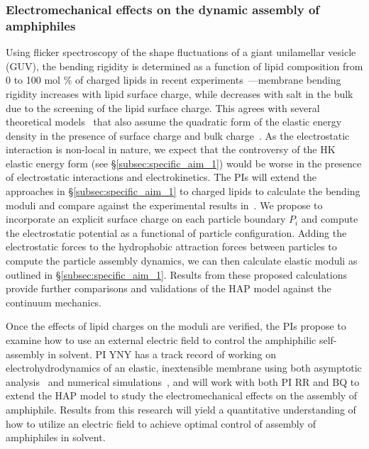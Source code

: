 \subsubsection{Electromechanical effects on the dynamic assembly of amphiphiles \label{subsubsec:em_effects}}
Using flicker spectroscopy of the shape fluctuations of a giant
unilamellar vesicle (GUV), the bending rigidity is determined as a
function of lipid composition from 0 to 100 mol $\%$ of charged lipids
in recent experiments~\cite{FaizEtAl2019_SoftMatt}---membrane bending
rigidity increases with lipid surface charge, while decreases with salt
in the bulk due to the screening of the lipid surface charge. This
agrees with several theoretical models~\cite{Kralchevsky1996_JCIS,
May1996_JChemPhys, LoubetEtAl2013_PRE} that also assume the quadratic
form of the elastic energy density in the presence of surface charge and
bulk charge~\cite{DuplantierGoldstein1990_PRL, Winterhalter1992_JPC}. As
the electrostatic interaction is non-local in nature, we expect that the
controversy of the HK elastic energy form (see
\S\ref{subsec:specific_aim_1}) would be worse in the presence of
electrostatic interactions and electrokinetics. The PIs will extend
the approaches in \S\ref{subsec:specific_aim_1} to charged lipids to
calculate the bending moduli and compare against the experimental
results in~\cite{FaizEtAl2019_SoftMatt}. We propose to incorporate an
explicit surface charge on each particle boundary $P_i$ and compute the
electrostatic potential as a functional of particle configuration.
Adding the electrostatic forces to the hydrophobic attraction forces
between particles to compute the particle assembly dynamics, we can then
calculate elastic moduli as outlined in \S\ref{subsec:specific_aim_1}.
Results from these proposed calculations provide further comparisons and
validations of the HAP model against the continuum mechanics.

Once the effects of lipid charges on the moduli are verified, the PIs
propose to examine how to use an external electric field to control the
amphiphilic self-assembly in solvent. PI YNY has a track record of
working on electrohydrodynamics of an elastic, inextensible membrane
using both asymptotic analysis~\cite{Nganguia2013_PRE, Young2014_JFM,
Young2015_PoF} and numerical simulations~\cite{Nganguia2015_CiCP}, and
will work with both PI RR and BQ to extend the HAP model to study the
electromechanical effects on the assembly of amphiphile. Results from
this research will yield a quantitative understanding of how to utilize
an electric field to achieve optimal control of assembly of amphiphiles
in solvent.




